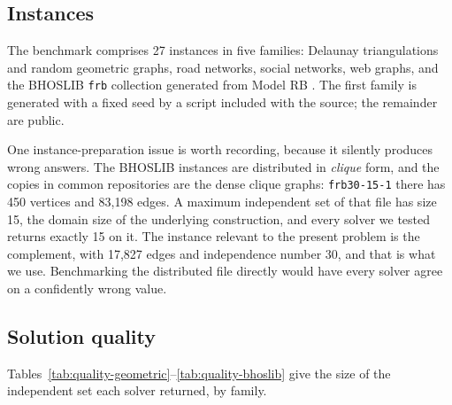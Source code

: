 \documentclass[preprint,12pt]{elsarticle}
\theoremstyle{definition}
\begin{document}
\subsection{Instances}

The benchmark comprises 27 instances in five families: Delaunay triangulations
and random geometric graphs, road networks, social networks, web graphs, and the
BHOSLIB \texttt{frb} collection generated from Model RB \cite{xu2007}. The first
family is generated with a fixed seed by a script included with the source; the
remainder are public.

One instance-preparation issue is worth recording, because it silently produces
wrong answers. The BHOSLIB instances are distributed in \emph{clique} form, and
the copies in common repositories are the dense clique graphs: \texttt{frb30-15-1}
there has 450 vertices and 83,198 edges. A maximum independent set of that file
has size 15, the domain size of the underlying construction, and every solver we
tested returns exactly 15 on it. The instance relevant to the present problem is
the complement, with 17,827 edges and independence number 30, and that is what
we use. Benchmarking the distributed file directly would have every solver agree
on a confidently wrong value.











\subsection{Solution quality}

Tables~\ref{tab:quality-geometric}--\ref{tab:quality-bhoslib} give the size of
the independent set each solver returned, by family.
\end{document}
